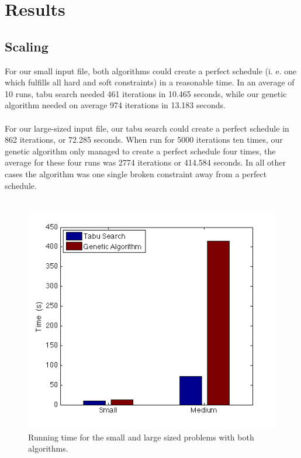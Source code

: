 \documentclass[titlepage,a4paper]{article}
\begin{document}
\pagebreak
\section{Results}
\subsection{Scaling}
For our small input file, both algorithms could create a perfect schedule (i. e. one which fulfills all hard and soft constraints) in a reasonable time. In an average of 10 runs, tabu search needed 461 iterations in 10.465 seconds, while our genetic algorithm needed on average 974 iterations in 13.183 seconds. \\\\
For our large-sized input file, our tabu search could create a perfect schedule in 862 iterations, or 72.285 seconds. When run for 5000 iterations ten times, our genetic algorithm only managed to create a perfect schedule four times, the average for these four runs was 2774 iterations or 414.584 seconds. In all other cases the algorithm was one single broken constraint away from a perfect schedule. \\\\

\begin{figure}[H]
  \centering
    \includegraphics[scale=0.5]{../results/time_bar_graph.png}
  \caption{Running time for the small and large sized problems with both algorithms.}
  \label{time_bar_graph}
\end{figure}
\end{document}
